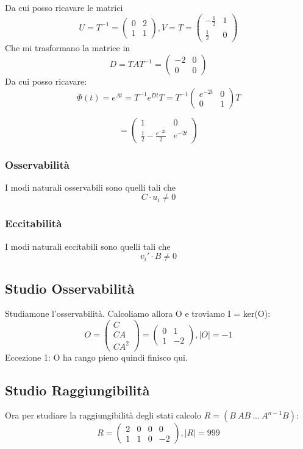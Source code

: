 \documentclass{article}
\begin{document}
Da cui posso ricavare le matrici \[U=T^{-1} = \left(\begin{matrix}0 & 2\\1 & 1\end{matrix}\right), V = T = \left(\begin{matrix}- \frac{1}{2} & 1\\\frac{1}{2} & 0\end{matrix}\right)\]
Che mi trasformano la matrice in \[ D = TAT^{-1} = \left(\begin{matrix}-2 & 0\\0 & 0\end{matrix}\right) \]
Da cui posso ricavare: \[ \Phi(t) = e^{At} = T^{-1} e^{Dt} T =  T^{-1} \left(\begin{matrix}e^{- 2 t} & 0\\0 & 1\end{matrix}\right) T\]

\[ = \left(\begin{matrix}1 & 0\\\frac{1}{2} - \frac{e^{- 2 t}}{2} & e^{- 2 t}\end{matrix}\right) \]\subsubsection{Osservabilità}
 I modi naturali osservabili sono quelli tali che 
\[ C \cdot u_i   \neq 0\]
\subsubsection{Eccitabilità}
 I modi naturali eccitabili sono quelli tali che 
\[v_i' \cdot B \neq 0\]

\subsection{Studio Osservabilità}

Studiamone l’osservabilità. Calcoliamo allora O e troviamo I = ker(O):
\[
 O = \begin{pmatrix}C \\ CA \\ CA^2 \end{pmatrix} = \left(\begin{matrix}0 & 1\\1 & -2\end{matrix}\right), |O| = -1 \]
Eccezione 1: O ha rango pieno quindi finisco qui.

\subsection{Studio Raggiungibilità}
Ora per studiare la raggiungibilità degli stati calcolo $R = (B\ AB\ ...\ A^{n-1}B)$: \[ R = \left(\begin{matrix}2 & 0 & 0 & 0\\1 & 1 & 0 & -2\end{matrix}\right), |R| = 999 \] 
\end{document}

